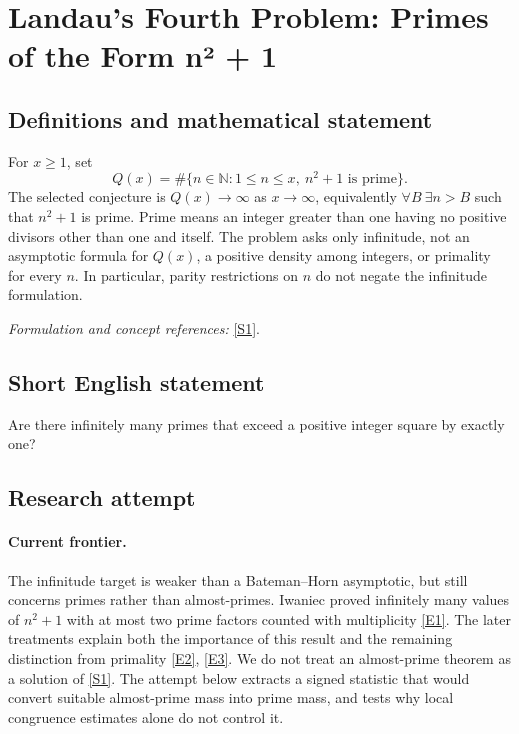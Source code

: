 \documentclass[11pt,a4paper]{article}
\newcommand{\N}{\mathbb{N}}
\newcommand{\sref}[2]{\hyperlink{source:#1:#2}{[S#2]}}
\newcommand{\eref}[2]{\hyperlink{extra:#1:#2}{[E#2]}}
\newif\ifshowcatalogue
\newcommand{\cataloguescope}[1]{\ifshowcatalogue
 \paragraph{Exact scope in the supplied catalogue.}
 \begin{quote}\small #1\end{quote}\fi}
\numberwithin{equation}{section}
\begin{document}
\setcounter{section}{0}
\clearpage
\section*{\texorpdfstring{Landau's Fourth Problem: Primes of the Form n² + 1}{Landau's Fourth Problem: Primes of the Form n² + 1}}\label{statement}
\subsection{Definitions and mathematical statement}
For $x\ge1$, set
\[
 Q(x)=\#\{n\in\N:1\le n\le x,\ n^2+1\text{ is prime}\}.
\]
The selected conjecture is $Q(x)\to\infty$ as $x\to\infty$, equivalently
$\forall B\ \exists n>B$ such that $n^2+1$ is prime. Prime means an integer greater than one having no positive divisors other than one and itself. The problem asks only infinitude, not an asymptotic formula for $Q(x)$, a positive density among integers, or primality for every $n$. In particular, parity restrictions on $n$ do not negate the infinitude formulation.
\par\smallskip\textit{Formulation and concept references:} \sref{statement}{1}.
\cataloguescope{Prove or disprove that there are infinitely many primes of the form n\textasciicircum{}2+1 with n a positive integer.}
\subsection{Short English statement}
Are there infinitely many primes that exceed a positive integer square by exactly one?
\subsection{Research attempt}

\paragraph{Current frontier.}
The infinitude target is weaker than a Bateman--Horn asymptotic, but still concerns primes rather than almost-primes. Iwaniec proved infinitely many values of $n^2+1$ with at most two prime factors counted with multiplicity \eref{statement}{1}. The later treatments explain both the importance of this result and the remaining distinction from primality \eref{statement}{2}, \eref{statement}{3}. We do not treat an almost-prime theorem as a solution of \sref{statement}{1}. The attempt below extracts a signed statistic that would convert suitable almost-prime mass into prime mass, and tests why local congruence estimates alone do not control it.
\end{document}
